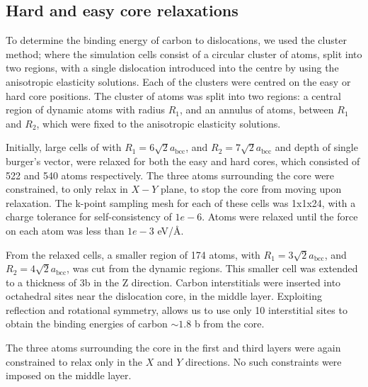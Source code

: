 \documentclass[a4paper]{article}
\begin{document}
\subsection{Hard and easy core relaxations}
\label{sec:org207a0fe}

To determine the binding energy of carbon to dislocations, we used the
cluster method; where the simulation cells consist of a circular cluster of
atoms, split into two regions, with a single dislocation introduced into the
centre by using the anisotropic elasticity solutions. Each of the clusters
were centred on the easy or hard core positions. The cluster of atoms was
split into two regions: a central region of dynamic atoms with radius \(R_1\),
and an annulus of atoms, between \(R_1\) and \(R_2\), which were fixed to the anisotropic
elasticity solutions. 

Initially, large cells of with \(R_1 = 6\sqrt{2}a_{\text{bcc}}\), and \(R_2 =
   7\sqrt{2}a_{\text{bcc}}\) and depth of single burger's vector, were relaxed
for both the easy and hard cores, which consisted of 522 and 540 atoms
respectively. The three atoms surrounding the core were constrained, to only
relax in \(X-Y\) plane, to stop the core from moving upon relaxation. The
k-point sampling mesh for each of these cells was 1x1x24, with a charge
tolerance for self-consistency of \(1e-6\). Atoms were relaxed until the force
on each atom was less than \(1e-3\) eV/\AA{}.  

From the relaxed cells, a smaller region of 174 atoms, with \(R_1 =
   3\sqrt{2}a_{\text{bcc}}\), and \(R_2 = 4\sqrt{2}a_{\text{bcc}}\), was cut from
the dynamic regions. This smaller cell was extended to a thickness of 3b in
the Z direction. Carbon interstitials were inserted into octahedral sites
near the dislocation core, in the middle layer. Exploiting reflection and
rotational symmetry, allows us to use only 10 interstitial
sites to obtain the binding energies of carbon \(\sim 1.8\) b from the core. 

The three atoms surrounding the core in the first and third layers were again
constrained to relax only in the \(X\) and \(Y\) directions. No such constraints
were imposed on the middle layer. 
\end{document}
